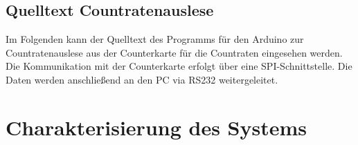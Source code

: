 \section{Quelltext
Countratenauslese}\label{anh:sec:quelltext_arduino_countrate} Im Folgenden kann
der Quelltext des Programms für den Arduino zur Countratenauslese aus der Counterkarte für die Countraten eingesehen werden. Die
Kommunikation mit der Counterkarte erfolgt über eine SPI-Schnittstelle. Die
Daten werden anschließend an den PC via RS232 weitergeleitet.


\chapter{Charakterisierung des Systems}\label{anh:kap:charakterisierung}

